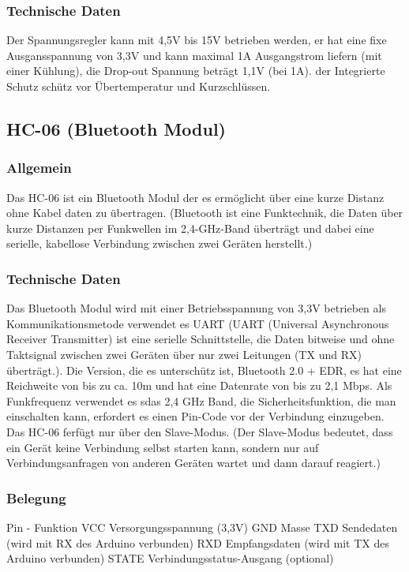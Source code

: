 \subsubsection{Technische Daten}
Der Spannungsregler kann mit 4,5V bis 15V betrieben werden, er hat eine fixe Ausgansspannung von 3,3V und kann maximal 1A Ausgangstrom liefern (mit einer Kühlung), 
die Drop-out Spannung beträgt 1,1V (bei 1A). der Integrierte Schutz schütz vor Übertemperatur und Kurzschlüssen.
%
\subsection{HC-06 (Bluetooth Modul)}
%
\subsubsection{Allgemein}
Das HC-06 ist ein Bluetooth Modul der es ermöglicht über eine kurze Distanz ohne Kabel daten zu übertragen. 
(Bluetooth ist eine Funktechnik, die Daten über kurze Distanzen per Funkwellen im 2,4-GHz-Band überträgt und dabei eine serielle, kabellose Verbindung zwischen zwei Geräten herstellt.)
\subsubsection{Technische Daten}
Das Bluetooth Modul wird mit einer Betriebsspannung von 3,3V betrieben als Kommunikationsmetode verwendet es UART 
(UART (Universal Asynchronous Receiver Transmitter) ist eine serielle Schnittstelle, die Daten bitweise und ohne Taktsignal zwischen zwei Geräten über nur zwei Leitungen (TX und RX) überträgt.).  
Die Version, die es unterschütz ist, Bluetooth 2.0 + EDR, es hat eine Reichweite von bis zu ca.  10m und hat eine Datenrate von bis zu 2,1 Mbps. 
Als Funkfrequenz verwendet es sdas 2,4 GHz Band, die Sicherheitsfunktion, die man einschalten kann, erfordert es einen Pin-Code vor der Verbindung einzugeben. 
Das HC-06 ferfügt nur über den Slave-Modus. 
(Der Slave-Modus bedeutet, dass ein Gerät keine Verbindung selbst starten kann, sondern nur auf Verbindungsanfragen von anderen Geräten wartet und dann darauf reagiert.)
\subsubsection{Belegung}
Pin	-	Funktion
VCC	Versorgungsspannung (3,3V)
GND	Masse
TXD	Sendedaten (wird mit RX des Arduino verbunden)
RXD	Empfangsdaten (wird mit TX des Arduino verbunden)
STATE	Verbindungsstatus-Ausgang (optional)

